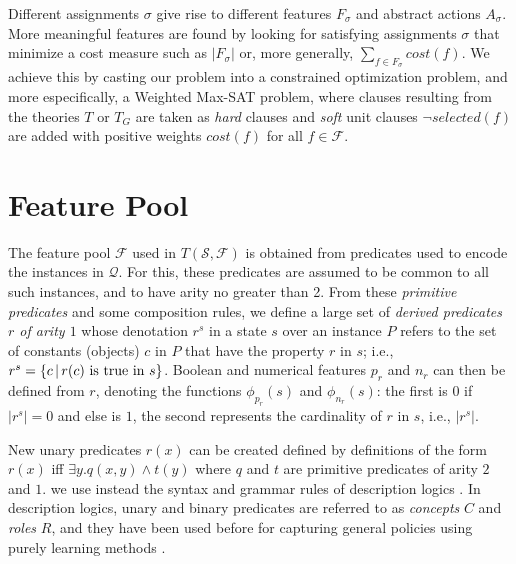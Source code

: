 \documentclass[letterpaper]{article} %
\newcommand{\Omit}[1]{}
\newtheorem{theorem}[definition]{Theorem}
\newcommand{\Q}{\mathcal{Q}}
\newcommand{\F}{\mathcal{F}}
\renewcommand{\S}{\mathcal{S}}
\begin{document}
\Omit{
Due to  \eqref{eq:d1} and \eqref{eq:goal} that force the selected features in $F_{\sigma}$
to   distinguish goal  from non-goal states, we have that:

\begin{theorem}
For a satisfying assignment $\sigma$  of $T(\S,\F)$, 
$s$ is expanded goal   state in $\S$  iff  $s$ satisfies  $G_F=G_{\sigma}$.
\end{theorem}
}
% 

Different assignments $\sigma$ give rise to different features $F_{\sigma}$
and abstract actions $A_{\sigma}$. More meaningful features are found by looking for
satisfying assignments $\sigma$ that minimize a cost measure such as $|F_{\sigma}|$
or, more generally, $\sum_{f \in F_{\sigma}} cost(f)$. We achieve this by casting our problem
into a constrained optimization problem, and more especifically, a Weighted Max-SAT problem,
where clauses resulting from the theories $T$ or $T_G$ are taken as \emph{hard} clauses
and \emph{soft} unit clauses $\neg selected(f)$ are added with  positive weights $cost(f)$
for all $f \in \F$.


\section{Feature Pool}

The feature pool $\F$ used in $T(\S,\F)$ is obtained 
from  predicates used to encode the instances in $\Q$.
For this, these predicates are assumed to be common to
all such instances, and to have arity no greater than 2.
From these \emph{primitive predicates} and some composition rules,
we define a large set of \emph{derived predicates $r$ of arity $1$}
whose denotation $r^s$ in a state $s$ over an instance $P$
refers to the set of constants (objects) $c$ in $P$ that
have the property $r$ in $s$; i.e., $r^s=\{c \, | \, r(c) \hbox{ is true in $s$}\}$.
Boolean and numerical features $p_r$ and $n_r$ can then be defined from  $r$,
denoting the functions $\phi_{p_r}(s)$ and $\phi_{n_r}(s)$: the first is $0$
if $|r^s|=0$ and else is $1$, the second represents the cardinality of $r$ in $s$,
i.e., $|r^s|$. 


New unary predicates $r(x)$ can be created  defined by definitions of the form $r(x)$ iff $\exists y. q(x,y) \land t(y)$
where $q$ and $t$ are primitive predicates of arity $2$ and $1$. we  use   instead the syntax and  grammar rules
of  description logics \cite{dl-handbook}.  In description logics, unary and binary predicates
are referred to as \emph{concepts} $C$  and \emph{roles} $R$, and they have been used before
for capturing general policies using purely learning methods  \cite{martin-geffner:generalized,fern:bias}.
\end{document}
